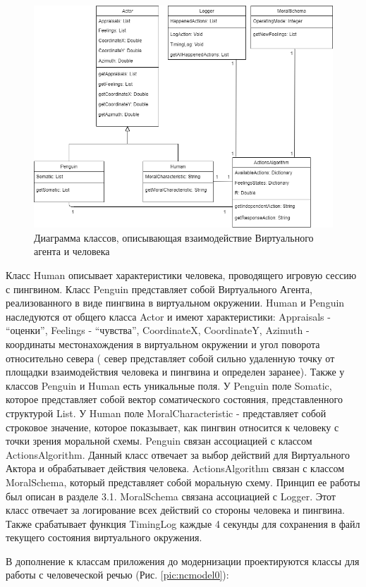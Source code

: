 \begin{figure}[h]
\includegraphics[width=0.75\columnwidth]{./img/oldcmodel2.png}
\centering
\caption{Диаграмма классов, описывающая взаимодействие Виртуального агента и человека}
\label{pic:oldcmodel2}
\end{figure}


Класс Human описывает характеристики человека, проводящего игровую сессию с пингвином. 
Класс Penguin представляет собой Виртуального Агента, реализованного в виде пингвина в виртуальном окружении. 
Human и Penguin наследуются от общего класса Actor и имеют характеристики: Appraisals - “оценки”, Feelings - “чувства”, 
CoordinateX, CoordinateY, Azimuth - координаты местонахождения в виртуальном окружении и угол поворота относительно севера (
север представляет собой сильно удаленную точку от площадки взаимодействия человека и пингвина и определен заранее).  
Также у классов Penguin и Human есть уникальные поля. У Penguin поле Somatic, которое представляет собой вектор соматического состояния, 
представленного структурой List. У Human поле MoralCharacteristic - представляет собой строковое значение, которое показывает, 
как пингвин относится к человеку с точки зрения моральной схемы. Penguin связан ассоциацией с классом ActionsAlgorithm. 
Данный класс отвечает за выбор действий для Виртуального Актора и обрабатывает действия человека. ActionsAlgorithm связан с классом MoralSchema, 
который представляет собой моральную схему. Принцип ее работы был описан в разделе 3.1. MoralSchema связана ассоциацией с Logger. 
Этот класс отвечает за логирование всех действий со стороны человека и пингвина. Также срабатывает функция TimingLog каждые 4 
секунды для сохранения в файл текущего состояния виртуального окружения.

В дополнение к классам приложения до модернизации проектируются классы для работы с человеческой речью (Рис. \ref{pic:ncmodel0}):

